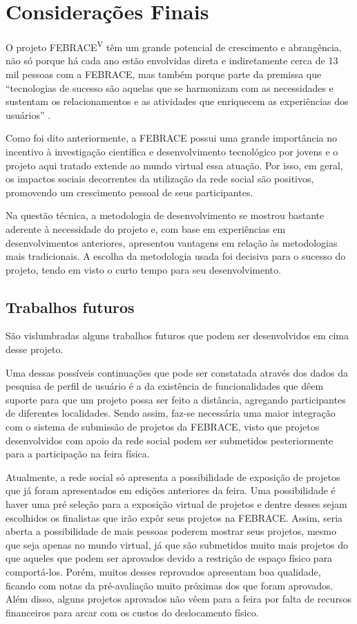 
\chapter{Considerações Finais}

O projeto FEBRACE\textsuperscript{V} têm um grande potencial de crescimento e abrangência, não só porque há cada ano estão envolvidas direta e indiretamente cerca de 13 mil pessoas com a FEBRACE, mas também porque parte da premissa que “tecnologias de sucesso são aquelas que se harmonizam com as necessidades e sustentam os relacionamentos e as atividades que enriquecem as experiências dos usuários” \cite{shneiderman06}.

Como foi dito anteriormente, a FEBRACE possui uma grande importância no incentivo à investigação científica e desenvolvimento tecnológico por jovens e o projeto aqui tratado extende ao mundo virtual essa atuação. Por isso, em geral, os impactos sociais decorrentes da utilização da rede social são positivos, promovendo um crescimento pessoal de seus participantes.

Na questão técnica, a metodologia de desenvolvimento se mostrou bastante aderente à necessidade do projeto e, com base em experiências em desenvolvimentos anteriores, apresentou vantagens em relação às metodologias mais tradicionais. A escolha da metodologia usada foi decisiva para o sucesso do projeto, tendo em visto o curto tempo para seu desenvolvimento.

\section{Trabalhos futuros}

São vislumbradas alguns trabalhos futuros que podem ser desenvolvidos em cima desse projeto. 

Uma dessas possíveis continuações que pode ser constatada através dos dados da pesquisa de perfil de usuário é a da existência de funcionalidades que dêem suporte para que um projeto possa ser feito a distância, agregando participantes de diferentes localidades. Sendo assim, faz-se necessária uma maior integração com o sistema de submissão de projetos da FEBRACE, visto que projetos desenvolvidos com apoio da rede social podem ser submetidos pesteriormente para a participação na feira física. 

Atualmente, a rede social só apresenta a possibilidade de exposição de projetos que já foram apresentados em edições anteriores da feira. Uma possibilidade é haver uma pré seleção para a exposição virtual de projetos e dentre desses sejam escolhidos os finalistas que irão expôr seus projetos na FEBRACE. Assim, seria aberta a possibilidade de mais pessoas poderem mostrar seus projetos, mesmo que seja apenas no mundo virtual, já que são submetidos muito mais projetos do que aqueles que podem ser aprovados devido a restrição de espaço físico para comportá-los. Porém, muitos desses reprovados apresentam boa qualidade, ficando com notas da pré-avaliação muito próximas dos que foram aprovados. Além disso, alguns projetos aprovados não vêem para a feira por falta de recursos financeiros para arcar com os custos do deslocamento físico.

